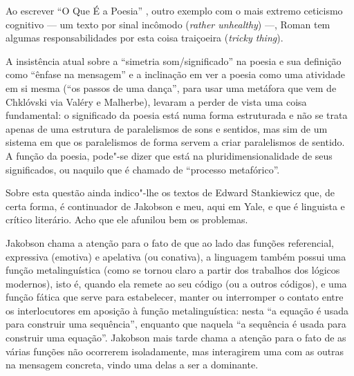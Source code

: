 Ao escrever ``O Que É a Poesia'' , outro exemplo com o mais extremo
ceticismo cognitivo --- um texto por sinal incômodo (\emph{rather
unhealthy}) ---, Roman tem algumas responsabilidades por esta coisa
traiçoeira (\emph{tricky thing}).

A insistência atual sobre a ``simetria som/significado'' na poesia e sua
definição como ``ênfase na mensagem'' e a inclinação em ver a poesia
como uma atividade em si mesma (``os passos de uma dança'', para usar
uma metáfora que vem de Chklóvski via Valéry e Malherbe), levaram a
perder de vista uma coisa fundamental: o significado da poesia está numa
forma estruturada e não se trata apenas de uma estrutura de paralelismos
de sons e sentidos, mas sim de um sistema em que os paralelismos de
forma servem a criar paralelismos de sentido. A função da poesia,
pode"-se dizer que está na pluridimensionalidade de seus significados, ou
naquilo que é chamado de ``processo metafórico''.

Sobre esta questão ainda indico"-lhe os textos de Edward Stankiewicz que,
de certa forma, é continuador de Jakobson e meu, aqui em Yale, e que é
linguista e crítico literário. Acho que ele afunilou bem os problemas.

Jakobson chama a atenção para o fato de que ao lado das funções
referencial, expressiva (emotiva) e apelativa (ou conativa), a linguagem
também possui uma função metalinguística (como se tornou claro a partir
dos trabalhos dos lógicos modernos), isto é, quando ela remete ao seu
código (ou a outros códigos), e uma função fática que serve para
estabelecer, manter ou interromper o contato entre os interlocutores em
aposição à função metalinguística: nesta ``a equação é usada para
construir uma sequência'', enquanto que naquela ``a sequência é usada
para construir uma equação''. Jakobson mais tarde chama a atenção para o
fato de as várias funções não ocorrerem isoladamente, mas interagirem
uma com as outras na mensagem concreta, vindo uma delas a ser a
dominante.


